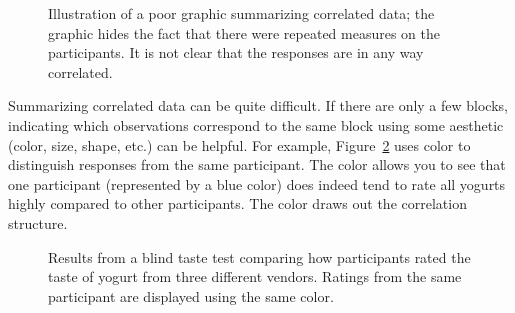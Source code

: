 \documentclass[
  letterpaper,
  DIV=11,
  numbers=noendperiod]{scrreprt}
\theoremstyle{plain}
\theoremstyle{definition}
\theoremstyle{definition}
\theoremstyle{remark}
\begin{document}
\begin{figure}


\caption{\label{fig-blocksummaries-bad-plot}Illustration of a poor
graphic summarizing correlated data; the graphic hides the fact that
there were repeated measures on the participants. It is not clear that
the responses are in any way correlated.}

\end{figure}%

Summarizing correlated data can be quite difficult. If there are only a
few blocks, indicating which observations correspond to the same block
using some aesthetic (color, size, shape, etc.) can be helpful. For
example, Figure~\ref{fig-blocksummaries-color-plot} uses color to
distinguish responses from the same participant. The color allows you to
see that one participant (represented by a blue color) does indeed tend
to rate all yogurts highly compared to other participants. The color
draws out the correlation structure.

\begin{figure}


\caption{\label{fig-blocksummaries-color-plot}Results from a blind taste
test comparing how participants rated the taste of yogurt from three
different vendors. Ratings from the same participant are displayed using
the same color.}

\end{figure}%
\end{document}
